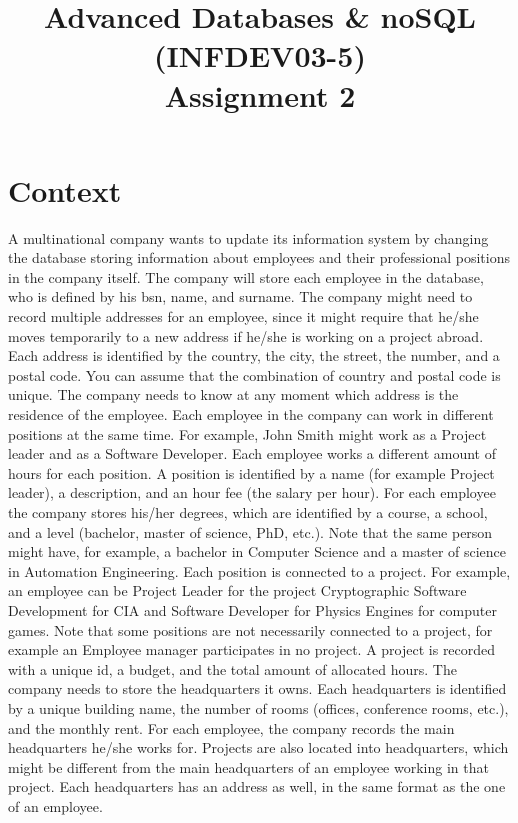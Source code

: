 \documentclass[10pt,a4paper]{article}
\title{Advanced Databases \& noSQL (INFDEV03-5) \\ Assignment 2}
\author { }
\date { }
\begin{document}
\maketitle

\section*{Context}
A multinational company wants to update its information system by changing the database storing information about employees and their professional positions in the company itself. 
The company will store each employee in the database, who is defined by his bsn, name, and surname. 
The company might need to record multiple addresses for an employee, since it might require that he/she moves temporarily to a new address if he/she is working on a project abroad. Each address is identified by the country, the city, the street, the number, and a postal code. You can assume that the combination of country and postal code is unique. The company needs to know at any moment which address is the residence of the employee.
Each employee in the company can work in different positions at the same time. For example, John Smith might work as a Project leader and as a Software Developer. Each employee works a different amount of hours for each position. A position is identified by a name (for example Project leader), a description, and an hour fee (the salary per hour).
For each employee the company stores his/her degrees, which are identified by a course, a school, and a level (bachelor, master of science, PhD, etc.). Note that the same person might have, for example, a bachelor in Computer Science and a master of science in Automation Engineering.
Each position is connected to a project. For example, an employee can be Project Leader for the project Cryptographic Software Development for CIA and Software Developer for Physics Engines for computer games. Note that some positions are not necessarily connected to a project, for example an Employee manager participates in no project. A project is recorded with a unique id, a budget, and the total amount of allocated hours.
The company needs to store the headquarters it owns. Each headquarters is identified by a unique building name, the number of rooms (offices, conference rooms, etc.), and the monthly rent. For each employee, the company records the main headquarters he/she works for. Projects are also located into headquarters, which might be different from the main headquarters of an employee working in that project. Each headquarters has an address as well, in the same format as the one of an employee.
\end{document}
